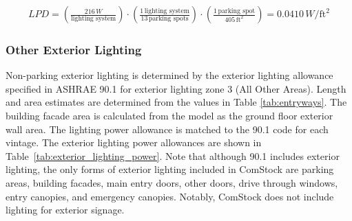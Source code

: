 \begin{align}
\label{ext_light_eqn}
LPD = \left(\frac{216\,W}{\text{lighting system}}\right) \cdot \left(\frac{1\,\text{lighting system}}{13\,\text{parking spots}}\right) \cdot \left(\frac{1\,\text{parking spot}}{405\,\text{ft}^2}\right) = 0.0410\,W/\text{ft}^2
\end{align}

%

\subsubsection{Other Exterior Lighting}
Non-parking exterior lighting is determined by the exterior lighting allowance specified in ASHRAE 90.1 for exterior lighting zone 3 (All Other Areas). Length and area estimates are determined from the values in Table \ref{tab:entryways}. The building facade area is calculated from the model as the ground floor exterior wall area. The lighting power allowance is matched to the 90.1 code for each vintage. The exterior lighting power allowances are shown in Table~\ref{tab:exterior_lighting_power}. Note that although 90.1 includes exterior lighting, the only forms of exterior lighting included in ComStock are parking areas, building facades, main entry doors, other doors, drive through windows, entry canopies, and emergency canopies. Notably, ComStock does not include lighting for exterior signage.

%
